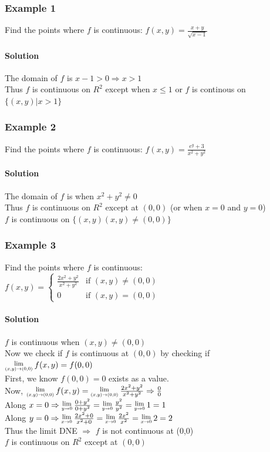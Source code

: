 \documentclass{article}
\newcommand{\Lim}[1]{\raisebox{0.5ex}{\scalebox{0.8}{$\displaystyle \lim_{#1}\;$}}}
\begin{document}
\subsubsection{Example 1}
Find the points where $f$ is continuous: $f(x,y)=\frac{x+y}{\sqrt{x-1}}$
\paragraph{Solution} The domain of $f$ is $x-1>0\Rightarrow x>1$
\\Thus $f$ is continuous on $R^2$ except when $x\leq1$ or $f$ is continous on $\{(x,y)|x>1\}$

\subsubsection{Example 2}
Find the points where $f$ is continuous: $f(x,y)=\frac{e^y+3}{x^2+y^2}$
\paragraph{Solution} The domain of $f$ is when $x^2+y^2\neq0$
\\Thus $f$ is continuous on $R^2$ except at $(0,0)$ (or when $x=0$ and $y=0$)
\\$f$ is continuous on $\{(x,y)(x,y)\neq(0,0)\}$

\subsubsection{Example 3}
Find the points where $f$ is continuous: $f(x,y)=\begin{cases}
    \frac{2x^2+y^2}{x^2+y^2} & \text{if } (x,y)\neq(0,0) \\
    0 & \text{if } (x,y)=(0,0)
\end{cases}$

\paragraph{Solution} $f$ is continuous when $(x,y)\neq(0,0)$
\\Now we check if $f$ is continuous at $(0,0)$ by checking if $\Lim{(x,y)\to(0,0)}f(x,y)=f(0,0)$
\\First, we know $f(0,0)=0$ exists as a value.
\\Now, $\Lim{(x,y)\to(0,0)}f(x,y)=\Lim{(x,y)\to(0,0)}\frac{2x^2+y^2}{x^2+y^2}\Rightarrow\frac{0}{0}$
\\Along $x=0\Rightarrow\Lim{y\to0}\frac{0+y^2}{0+y^2}=\Lim{y\to0}\frac{y^2}{y^2}=\Lim{y\to0}1=1$
\\Along $y=0\Rightarrow\Lim{x\to0}\frac{2x^2+0}{x^2+0}=\Lim{x\to0}\frac{2x^2}{x^2}=\Lim{x\to0}2=2$
\\Thus the limit DNE $\Rightarrow$ $f$ is not continuous at (0,0)
\\$f$ is continuous on $R^2$ except at $(0,0)$
\end{document}
